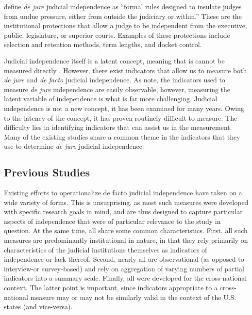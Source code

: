 \documentclass[12pt]{article}
\begin{document}
\citet[3]{Rios2014} define \textit{de jure} judicial independence as ``formal rules designed to insulate judges from undue pressure, either from outside the judiciary or within.''  These are the institutional protections that allow a judge to be independent from the executive, public, legislature, or superior courts.  Examples of these protections include selection and retention methods, term lengths, and docket control.

Judicial independence itself is a latent concept, meaning that is cannot be measured directly \citep[203]{Treier2008}.  However, there exist indicators that allow us to measure both \textit{de jure} and \textit{de facto} judicial independence.  As \citet[5]{Rios2014} note, the indicators used to measure \textit{de jure} independence are easily observable, however, measuring the latent variable of independence is what is far more challenging.  Judicial independence is not a new concept, it has been examined for many years.  Owing to the latency of the concept, it has proven routinely difficult to measure.  The difficulty lies in identifying indicators that can assist us in the measurement.  Many of the existing studies share a common theme in the indicators that they use to determine \textit{de jure} judicial independence.  

\subsection*{Previous Studies}%
Existing efforts to operationalize de facto judicial independence have taken on a wide variety of forms. This is unsurprising, as most such measures were developed with specific research goals in mind, and are thus designed to capture particular aspects of independence that were of particular relevance to the study in question. At the same time, all share some common characteristics. First, all such measures are predominantly institutional in nature, in that they rely primarily on characteristics of the judicial institutions themselves as indicators of independence or lack thereof. Second, nearly all are observational (as opposed to interview-or survey-based) and rely on aggregation of varying numbers of partial indicators into a 
summary scale. Finally, all were developed for the cross-national context. The latter point is important, since indicators appropriate to a cross-national measure may or may not be similarly valid in the context of the U.S. states (and vice-versa).
\end{document}
